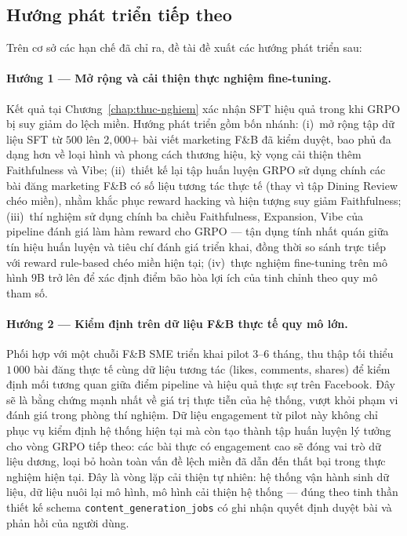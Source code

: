 \subsection{Hướng phát triển tiếp theo}

Trên cơ sở các hạn chế đã chỉ ra, đề tài đề xuất các hướng phát
triển sau:

\paragraph{Hướng 1 --- Mở rộng và cải thiện thực nghiệm fine-tuning.}
Kết quả tại Chương~\ref{chap:thuc-nghiem} xác nhận SFT hiệu quả trong
khi GRPO bị suy giảm do lệch miền. Hướng phát triển gồm bốn nhánh:
(i)~mở rộng tập dữ liệu SFT từ $500$ lên $2{,}000$+ bài viết
marketing F\&B đã kiểm duyệt, bao phủ đa dạng hơn về loại hình và
phong cách thương hiệu, kỳ vọng cải thiện thêm Faithfulness và Vibe;
(ii)~thiết kế lại tập huấn luyện GRPO sử dụng chính các bài đăng
marketing F\&B có số liệu tương tác thực tế (thay vì tập Dining Review
chéo miền), nhằm khắc phục reward hacking và hiện tượng suy giảm
Faithfulness; (iii)~thí nghiệm sử dụng chính ba chiều Faithfulness,
Expansion, Vibe của pipeline đánh giá làm hàm reward cho GRPO ---
tận dụng tính nhất quán giữa tín hiệu huấn luyện và tiêu chí đánh giá
triển khai, đồng thời so sánh trực tiếp với reward rule-based chéo
miền hiện tại; (iv)~thực nghiệm fine-tuning trên mô hình $9$B trở lên
để xác định điểm bão hòa lợi ích của tinh chỉnh theo quy mô tham số.

\paragraph{Hướng 2 --- Kiểm định trên dữ liệu F\&B thực tế quy mô
lớn.} Phối hợp với một chuỗi F\&B SME triển khai pilot $3$--$6$
tháng, thu thập tối thiểu $1\,000$ bài đăng thực tế cùng dữ liệu
tương tác (likes, comments, shares) để kiểm định mối tương quan
giữa điểm pipeline và hiệu quả thực sự trên Facebook. Đây sẽ là
bằng chứng mạnh nhất về giá trị thực tiễn của hệ thống, vượt khỏi
phạm vi đánh giá trong phòng thí nghiệm. Dữ liệu engagement từ
pilot này không chỉ phục vụ kiểm định hệ thống hiện tại mà còn tạo
thành tập huấn luyện lý tưởng cho vòng GRPO tiếp theo: các bài thực
có engagement cao sẽ đóng vai trò dữ liệu dương, loại bỏ hoàn toàn
vấn đề lệch miền đã dẫn đến thất bại trong thực nghiệm hiện tại.
Đây là vòng lặp cải thiện tự nhiên: hệ thống vận hành sinh dữ liệu,
dữ liệu nuôi lại mô hình, mô hình cải thiện hệ thống --- đúng theo
tinh thần thiết kế schema \texttt{content\_generation\_jobs} có ghi
nhận quyết định duyệt bài và phản hồi của người dùng.

